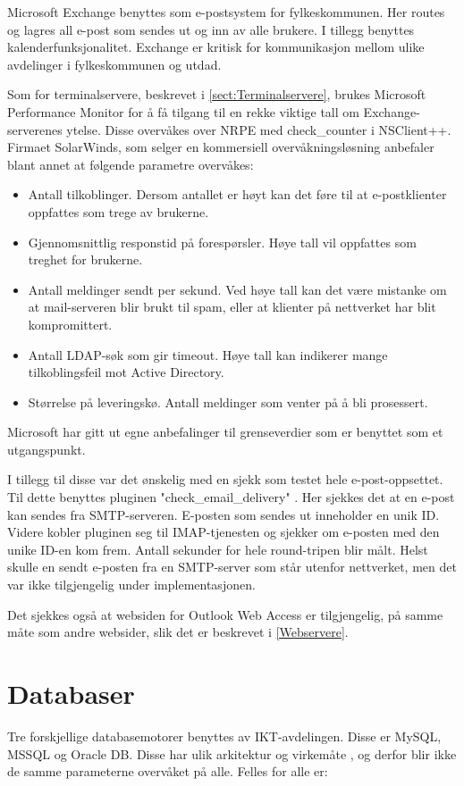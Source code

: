 Microsoft Exchange benyttes som e-postsystem for fylkeskommunen. Her routes og lagres all e-post som sendes ut og inn av alle brukere. I tillegg benyttes kalenderfunksjonalitet. Exchange er kritisk for kommunikasjon mellom ulike avdelinger i fylkeskommunen og utdad. 

Som for terminalservere, beskrevet i \ref{sect:Terminalservere}, brukes Microsoft Performance Monitor for å få tilgang til en rekke viktige tall om Exchange-serverenes ytelse. Disse overvåkes over NRPE med check\_counter i NSClient++. Firmaet SolarWinds, som selger en kommersiell overvåkningsløsning anbefaler blant annet at følgende parametre overvåkes\cite{exchange}:
\begin{itemize}
	\item Antall tilkoblinger. Dersom antallet er høyt kan det føre til at e-postklienter oppfattes som trege av brukerne.
	\item Gjennomsnittlig responstid på forespørsler. Høye tall vil oppfattes som treghet for brukerne.
	\item Antall meldinger sendt per sekund. Ved høye tall kan det være mistanke om at mail-serveren blir brukt til spam, eller at klienter på nettverket har blit kompromittert.
	\item Antall LDAP-søk som gir timeout. Høye tall kan indikerer mange tilkoblingsfeil mot Active Directory.
	\item Størrelse på leveringskø. Antall meldinger som venter på å bli prosessert.
\end{itemize}
Microsoft har gitt ut egne anbefalinger til grenseverdier som er benyttet som et utgangspunkt\cite{exchangethresholds}.

I tillegg til disse var det ønskelig med en sjekk som testet hele e-post-oppsettet. Til dette benyttes pluginen "check\_email\_delivery" \cite{exchange}. Her sjekkes det at en e-post kan sendes fra SMTP-serveren. E-posten som sendes ut inneholder en unik ID. Videre kobler pluginen seg til IMAP-tjenesten og sjekker om e-posten med den unike ID-en kom frem. Antall sekunder for hele round-tripen blir målt. Helst skulle en sendt e-posten fra en SMTP-server som står utenfor nettverket, men det var ikke tilgjengelig under implementasjonen.

Det sjekkes også at websiden for Outlook Web Access er tilgjengelig, på samme måte som andre websider, slik det er beskrevet i \ref{Webservere}.
\section{Databaser}
Tre forskjellige databasemotorer benyttes av IKT-avdelingen. Disse er MySQL, MSSQL og Oracle DB. Disse har ulik arkitektur og virkemåte \cite{databasecomparison}, og derfor blir ikke de samme parameterne overvåket på alle. Felles for alle er:

